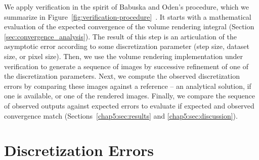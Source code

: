 
We apply verification in the spirit of Babuska and Oden's procedure,
which we summarize in
Figure~\ref{fig:verification-procedure}~\cite{babuska04}. It starts
with a mathematical evaluation of the expected convergence of the
volume rendering integral (Section
\ref{sec:convergence_analysis}). The result of this step is an articulation of the
asymptotic error according to some discretization parameter (step
size, dataset size, or pixel size). Then, we use the volume rendering
implementation under verification to generate a sequence of images by
successive refinement of one of the discretization parameters. Next,
we compute the observed discretization errors by comparing these
images against a reference -- an analytical solution, if one is
available, or one of the rendered images. Finally, we compare the
sequence of observed outputs against expected errors to evaluate if expected
and observed convergence match (Sections~\ref{chap5:sec:results} and
\ref{chap5:sec:discussion}).  



\section{Discretization Errors}
\label{sec:volume-rendering}


